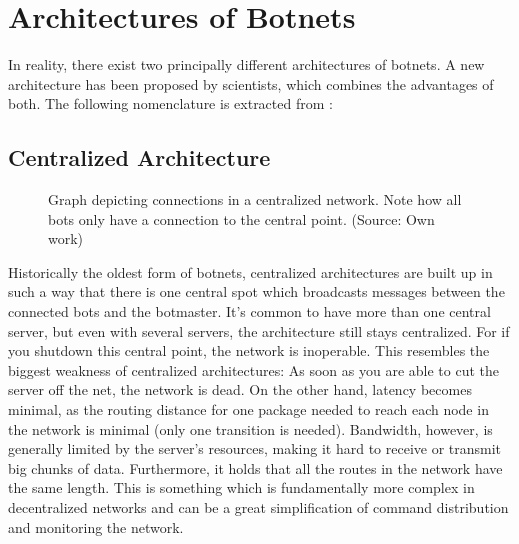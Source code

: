 \documentclass{llncs}
\begin{document}
\section{Architectures of Botnets}
\label{architecture}
In reality, there exist two principally different architectures of
botnets. A new architecture has been proposed by scientists, which
combines the advantages of both. The following nomenclature is
extracted from \cite{steggink2007detection}:
\subsection{Centralized Architecture}
%
%
\begin{figure}[htbp]
  \centering
  \caption{Graph depicting connections in a centralized network. Note
    how all bots only have a connection to the central point. (Source: Own work)}
  \label{central-network}
\end{figure}
Historically the oldest form of botnets, centralized architectures are
built up in such a way that there is one central spot which broadcasts
messages between the connected bots and the botmaster.  It's common to
have more than one central server\cite{td1sc}, but even with several
servers, the architecture still stays centralized. For if you shutdown
this central point, the network is inoperable. This resembles the
biggest weakness of centralized architectures: As soon as you are able
to cut the server off the net, the network is dead. On the other hand,
latency becomes minimal, as the routing distance for one package
needed to reach each node in the network is minimal (only one
transition is needed). Bandwidth, however, is generally limited by the
server's resources, making it hard to receive or transmit big chunks
of data. Furthermore, it holds that all the routes in the network have
the same length. This is something which is fundamentally more complex
in decentralized networks and can be a great simplification of command
distribution and monitoring the network.
\end{document}
